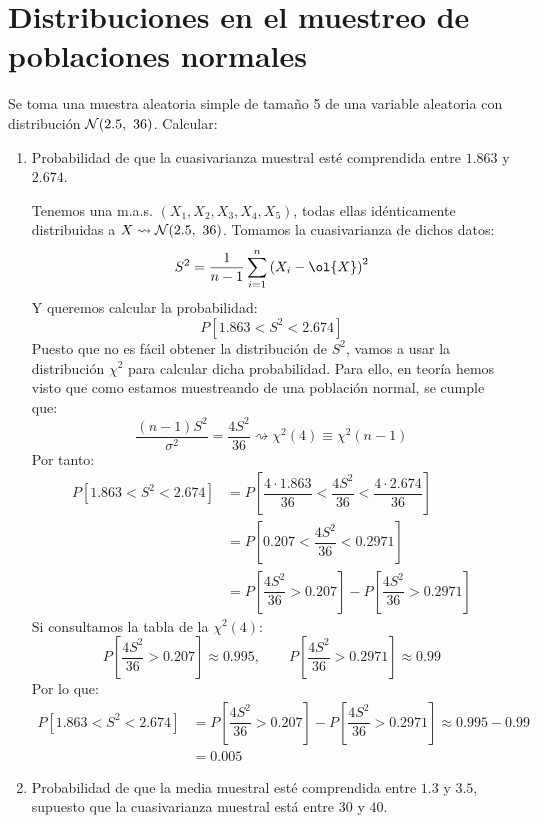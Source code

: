 \section{Distribuciones en el muestreo de poblaciones normales}

\begin{ejercicio}
    Se toma una muestra aleatoria simple de tamaño 5 de una variable aleatoria con distribución $\cc{N}(2.5,\ 36)$. Calcular:
    \begin{enumerate}[label=\alph*)]
        \item Probabilidad de que la cuasivarianza muestral esté comprendida entre $1.863$ y $2.674$.

            Tenemos una m.a.s. $(X_1, X_2, X_3, X_4, X_5)$, todas ellas idénticamente distribuidas a $X\rightsquigarrow \mathcal{N}(2.5,\ 36)$. Tomamos la cuasivarianza de dichos datos:
            \begin{equation*}
                S^2 = \dfrac{1}{n-1} \sum_{i=1}^n {(X_i - \ol{X})}^{2}
            \end{equation*}
            Y queremos calcular la probabilidad:
            \begin{equation*}
                P\left[1.863 < S^2 < 2.674\right]
            \end{equation*}
            Puesto que no es fácil obtener la distribución de $S^2$, vamos a usar la distribución $\chi^2$ para calcular dicha probabilidad. Para ello, en teoría hemos visto que como estamos muestreando de una población normal, se cumple que:
            \begin{equation*}
                \dfrac{(n-1)S^2}{\sigma^2}= \dfrac{4S^2}{36} \rightsquigarrow\chi^2(4) \equiv \chi^2(n-1)
            \end{equation*}
            Por tanto:
            \begin{align*}
                P[1.863 < S^2 < 2.674] &= P\left[\dfrac{4\cdot 1.863}{36}<\dfrac{4S^2}{36} < \dfrac{4\cdot 2.674}{36}\right] \\
                                       &= P\left[0.207 < \dfrac{4S^2}{36} < 0.2971\right]  \\
                                       &= P\left[\dfrac{4S^2}{36} > 0.207\right] - P\left[\dfrac{4S^2}{36}>0.2971\right]
            \end{align*}
            Si consultamos la tabla de la $\chi^2(4)$:
            \begin{equation*}
                P\left[\dfrac{4S^2}{36} > 0.207\right] \approx 0.995, \qquad 
                P\left[\dfrac{4S^2}{36}>0.2971\right] \approx 0.99
            \end{equation*}
            Por lo que:
            \begin{align*}
                P[1.863 < S^2 < 2.674] &= P\left[\dfrac{4S^2}{36} > 0.207\right] - P\left[\dfrac{4S^2}{36}>0.2971\right] \approx 0.995 - 0.99 \\
                                       &= 0.005
            \end{align*}
        \item Probabilidad de que la media muestral esté comprendida entre $1.3$ y $3.5$, supuesto que la cuasivarianza muestral está entre $30$ y $40$. 


\end{enumerate}
\end{ejercicio}
